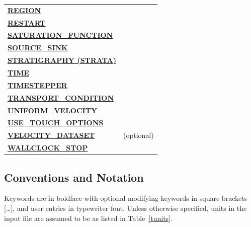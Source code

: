\documentclass[12pt]{article}
\begin{document}
\begin{longtable}{ll}
\hyperlink{target_region}{\bf REGION} & \\
\hyperlink{target_restart}{\bf RESTART} & \\
\hyperlink{target_sat}{\bf SATURATION\_FUNCTION} & \\
\hyperlink{target_src}{\bf SOURCE\_SINK} & \\
\hyperlink{target_strata}{\bf STRATIGRAPHY (STRATA)} & \\
\hyperlink{target_time}{\bf TIME} & \\
\hyperlink{target_timestep}{\bf TIMESTEPPER} & \\
\hyperlink{target_trans_cond}{\bf TRANSPORT\_CONDITION} & \\
\hyperlink{target_unifvel}{\bf UNIFORM\_VELOCITY} & \\
\hyperlink{target_touch}{\bf USE\_TOUCH\_OPTIONS} & \\
\hyperlink{target_veldata}{\bf VELOCITY\_DATASET} & (optional) \\
\hyperlink{target_wallclk}{\bf WALLCLOCK\_STOP} & \\
\bottomrule[1.5pt]
\end{longtable}


\subsection{\bf Conventions and Notation} 

Keywords are in boldface with optional modifying keywords in square brackets [\ldots], and user entries in typewriter font.
Unless otherwise specified, units in the input file are assumed to be as listed in Table~\ref{tunits}.
\end{document}
